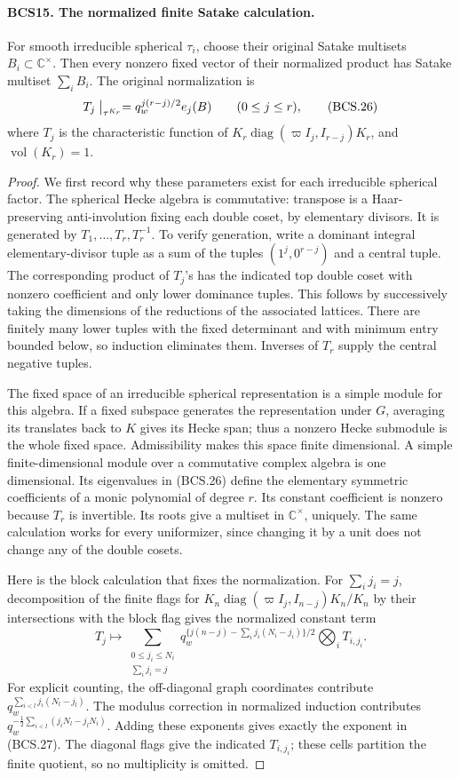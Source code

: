 \paragraph{BCS15. The normalized finite Satake calculation.}
\label{claim:BCS15}
For smooth irreducible spherical \(\tau_i\), choose their
original Satake multisets \(B_i\subset\mathbb C^\times\).
Then every nonzero fixed vector of their normalized product has
Satake multiset \(\sum_iB_i\).  The original normalization is
\[
 T_j\bigm|_{\tau^{K_r}}=
             q_w^{j(r-j)/2}e_j(B)\qquad(0\le j\le r),
 \tag{BCS.26}
\]
where \(T_j\) is the characteristic function of
\(K_r\operatorname{diag}(\varpi I_j,I_{r-j})K_r\), and
\(\operatorname{vol}(K_r)=1\).
\begin{proof}
We first record why these parameters exist for each irreducible
spherical factor.  The spherical Hecke algebra is commutative:
transpose is a Haar-preserving anti-involution fixing each double
coset, by elementary divisors.  It is generated by
\(T_1,\ldots,T_r,T_r^{-1}\).  To verify generation, write a
dominant integral elementary-divisor tuple as a sum of the tuples
\((1^j,0^{r-j})\) and a central tuple.  The corresponding product
of \(T_j\)'s has the indicated top double coset with nonzero
coefficient and only lower dominance tuples.  This follows by
successively taking the dimensions of the reductions of the
associated lattices.  There are finitely many lower tuples with
the fixed determinant and with minimum entry bounded below, so
induction eliminates them.  Inverses of \(T_r\) supply the central
negative tuples.

The fixed space of an irreducible spherical representation is a
simple module for this algebra.  If a fixed subspace generates the
representation under \(G\), averaging its translates back to
\(K\) gives its Hecke span; thus a nonzero Hecke submodule is the
whole fixed space.  Admissibility makes this space finite dimensional.
A simple finite-dimensional module over a commutative complex algebra
is one dimensional.  Its eigenvalues in (BCS.26) define the
elementary symmetric coefficients of a monic polynomial of degree
\(r\).  Its constant coefficient is nonzero because \(T_r\) is
invertible.  Its roots give a multiset in \(\mathbb C^\times\),
uniquely.  The same calculation works for every uniformizer, since
changing it by a unit does not change any of the double cosets.

Here is the block calculation that fixes the normalization.  For
\(\sum_i j_i=j\), decomposition of the finite flags for
\(K_n\operatorname{diag}(\varpi I_j,I_{n-j})K_n/K_n\) by their
intersections with the block flag gives the normalized constant term
\[
 T_j\longmapsto
 \sum_{\substack{0\le j_i\le N_i\\\sum_i j_i=j}}
 q_w^{\{j(n-j)-\sum_i j_i(N_i-j_i)\}/2}
                         \bigotimes_i T_{i,j_i}.
 \tag{BCS.27}
\]
For explicit counting, the off-diagonal graph coordinates contribute
\(q_w^{\sum_{i<l}j_i(N_l-j_l)}\).  The modulus correction in
normalized induction contributes
\(q_w^{-\frac12\sum_{i<l}(j_iN_l-j_lN_i)}\).
Adding these exponents gives exactly the exponent in (BCS.27).
The diagonal flags give the indicated \(T_{i,j_i}\); these cells
partition the finite quotient, so no multiplicity is omitted.


\end{proof}
